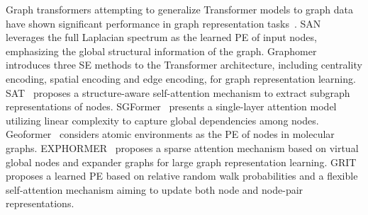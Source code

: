 Graph transformers attempting to generalize Transformer models to graph data have shown significant performance in graph representation tasks~\citep{kong2023goat,luo2024transformers,luo2024fairgt}. SAN~\citep{kreuzer2021rethinking} leverages the full Laplacian spectrum as the learned PE of input nodes, emphasizing the global structural information of the graph. Graphomer~\citep{ying2021transformers} introduces three SE methods to the Transformer architecture, including centrality encoding, spatial encoding and edge encoding, for graph representation learning. SAT~\citep{chen2022structure} proposes a structure-aware self-attention mechanism to extract subgraph representations of nodes. SGFormer~\citep{wu2024simplifying} presents a single-layer attention model utilizing linear complexity to capture global dependencies among nodes. Geoformer~\citep{wang2024geometric} considers atomic environments as the PE of nodes in molecular graphs. EXPHORMER~\citep{shirzad2023exphormer} proposes a sparse attention mechanism based on virtual global nodes and expander graphs for large graph representation learning. GRIT~\citep{ma2023graph} proposes a learned PE based on relative random walk probabilities and a flexible self-attention mechanism aiming to update both node and node-pair representations.